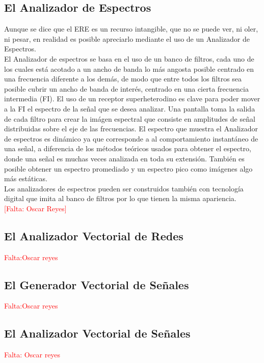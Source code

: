 \subsection{El Analizador de Espectros}

Aunque se dice que el ERE es un recurso intangible, que no se puede ver, ni oler, ni pesar, en realidad es posible apreciarlo mediante el uso de un Analizador de Espectros.\\

El Analizador de espectros se basa en el uso de un banco de filtros, cada uno de los cuales está acotado a un ancho de banda lo más angosta posible centrado en una frecuencia diferente a los demás, de modo que entre todos los filtros sea posible cubrir un ancho de banda de interés, centrado en una cierta frecuencia intermedia (FI). El uso de un receptor superheterodino es clave para poder mover a la FI el espectro de la señal que se desea analizar. Una pantalla toma la salida de cada filtro para crear la imágen espectral que consiste en amplitudes de señal distribuidas sobre el eje de las frecuencias. El espectro que muestra el Analizador de espectros es dinámico ya que corresponde a al comportamiento instantáneo de una señal, a diferencia de los métodos teóricos usados para obtener el espectro, donde una señal es muchas veces analizada en toda su extensión. También es posible obtener un espectro promediado y un espectro pico como imágenes algo más estáticas. \\

Los analizadores de espectros pueden ser construidos también con tecnología digital que imita al banco de filtros por lo que tienen la misma apariencia.\\
\textcolor{red}{[Falta: Oscar Reyes]} %


\subsection{El Analizador Vectorial de Redes}
\textcolor{red}{Falta:Oscar reyes }\\


\subsection{El Generador Vectorial de Señales}
\textcolor{red}{Falta:Oscar reyes }\\
\subsection{El Analizador Vectorial de Señales}
\textcolor{red}{Falta: Oscar reyes }\\



